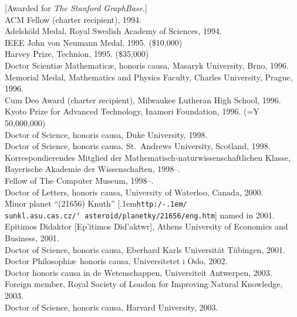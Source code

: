  [Awarded for {\sl The Stanford GraphBase}.]
\\ACM Fellow (charter recipient), 1994.
\\Adelsk\"old Medal, Royal Swedish Academy of Sciences, 1994.
\\IEEE John von Neumann Medal, 1995. (\$10,000)
\\Harvey Prize, Technion, 1995. (\$35,000)
\\Doctor Scienti{\ae} Mathematic{\ae}, honoris causa, Masaryk University,
 Brno, 1996. %
\\Memorial Medal, Mathematics and Physics Faculty, Charles University, Prague,
 1996.
\\Cum Deo Award (charter recipient), Milwaukee Lutheran High School, 1996.
\\Kyoto Prize for Advanced Technology, Inamori Foundation, 1996.
 (=\hbox{Y}
 50,000,000)
\\Doctor of Science, honoris causa, Duke University, 1998. %
\\Doctor of Science, honoris causa, St.\ Andrews University,
 Scotland, 1998. %
\\Korrespondierendes Mitglied der Mathematisch-naturwissenschaftlichen Klasse,
 Bayerische Akademie der Wissenschaften, 1998--.
\\Fellow of The Computer Museum, 1998--.
\\Doctor of Letters, honoris causa, University of Waterloo, Canada, 2000. %
\\Minor planet ``(21656) Knuth''
 [\kern.1em{\tt http:/\kern-.1em/%
 sunkl.asu.cas.cz/\char`~asteroid/planetky/21656/eng.htm}]
 named in 2001.
\\Epitimos Didaktor [{\grk Ep'itimos Did'aktwr}], %
 Athens University of Economics and Business, 2001. %
\\Doctor of Science, honoris causa, Eberhard Karls Universit\"at T\"ubingen,
 2001. %
\\Doctor Philosophi\ae\ honoris causa, Universitetet i Oslo, 2002. %
\\Doctor honoris causa in de Wetenschappen, Universiteit Antwerpen, 2003. %
\\Foreign member, Royal Society of London for
 Improving Natural Knowledge, 2003.
\\Doctor of Science, honoris causa, Harvard University, 2003. %
